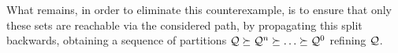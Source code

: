 What remains, in order to eliminate this counterexample, is to ensure that only these sets are reachable via the considered path, by propagating this split backwards, obtaining a sequence of partitions $\mathcal{Q} \succeq \mathcal{Q}^n \succeq \ldots \succeq \mathcal{Q}^0$ refining $\mathcal{Q}$. 


